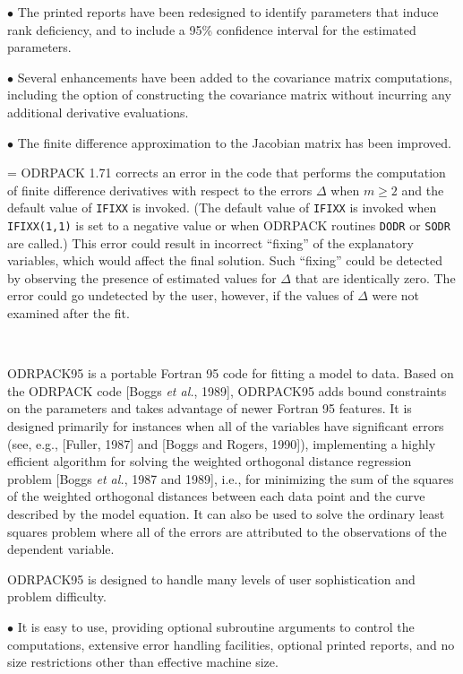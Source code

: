 \aligntobox $\bullet$ The printed reports have been redesigned to identify parameters that induce rank deficiency, and to include a 95\% confidence interval for the estimated parameters.

\aligntobox $\bullet$ Several enhancements have been added to the covariance matrix computations, including the option of constructing the covariance matrix without incurring any additional derivative evaluations.

\aligntobox $\bullet$ The finite difference approximation to the Jacobian matrix has been improved.\medskip

\hangindent=\wd\mybox{} ODRPACK 1.71 corrects an error in the code that performs the computation of finite difference derivatives with respect to the errors $\Delta$ when $m\geq2$ and the default value of {\tt IFIXX} is invoked. (The default value of {\tt IFIXX} is invoked when {\tt IFIXX(1,1)} is set to a negative value or when ODRPACK routines {\tt DODR} or {\tt SODR} are called.) This error could result in incorrect ``fixing'' of the explanatory variables, which would affect the final solution. Such ``fixing'' could be detected by observing the presence of estimated values for $\Delta$ that are identically zero. The error could go undetected by the user, however, if the values of $\Delta$ were not examined after the fit.
\vfil\eject

\ 
\vskip 1.4in
\def\thissection{Preface}
\bigskip\bigskip

\noindent ODRPACK95 is a portable Fortran 95 code for fitting a
model to data.  Based on the ODRPACK code [Boggs {\it et al.}, 1989], ODRPACK95
adds bound constraints on the parameters and takes advantage of newer Fortran 95
features.  It is designed primarily for instances when all of the
variables have significant errors (see, e.g., [Fuller, 1987] and
[Boggs and Rogers, 1990]), implementing a highly efficient algorithm for
solving the weighted orthogonal distance regression problem [Boggs {\it
et al.}, 1987 and 1989], i.e., for minimizing the sum of the squares
of the weighted orthogonal distances between each data point and the
curve described by the model equation. It can also be used to solve the
ordinary least squares problem where all of the errors are attributed
to the observations of the dependent variable.

\noindent ODRPACK95 is designed to handle many levels of user sophistication and problem difficulty.

\item{$\bullet$} It is easy to use, providing optional subroutine
arguments to control the computations, extensive error handling
facilities, optional printed reports, and no size restrictions other
than effective machine size.

